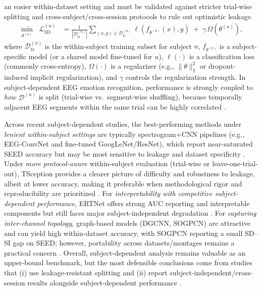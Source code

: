 \documentclass{WileyMSP-template}
\begin{document}
an easier within-dataset setting and must be validated against stricter trial-wise splitting and cross-subject/cross-session protocols to rule out optimistic leakage.
\begin{align}
\min_{\theta^{(u)}}\;\; \mathcal{L}_{\mathrm{SD}}^{(u)}
&=\frac{1}{|\mathcal{D}^{(u)}_{\mathrm{tr}}|}\sum_{(x,y)\in \mathcal{D}^{(u)}_{\mathrm{tr}}}\ell\!\left(f_{\theta^{(u)}}(x),y\right)
\;+\;\gamma\,\Omega\!\left(\theta^{(u)}\right),
\label{eq:subject_dependent_objective}
\end{align}
where $\mathcal{D}^{(u)}_{\mathrm{tr}}$ is the within-subject training subset for subject $u$, $f_{\theta^{(u)}}$ is a subject-specific model (or a shared model fine-tuned for $u$), $\ell(\cdot)$ is a classification loss (commonly cross-entropy), $\Omega(\cdot)$ is a regularizer (e.g., $\|\theta\|_2^2$ or dropout-induced implicit regularization), and $\gamma$ controls the regularization strength. In subject-dependent EEG emotion recognition, performance is strongly coupled to \emph{how} $\mathcal{D}^{(u)}$ is split (trial-wise vs.\ segment-wise shuffling), because temporally adjacent EEG segments within the same trial can be highly correlated \cite{ding2022tsception}.

Across recent subject-dependent studies, the best-performing methods under \emph{lenient within-subject settings} are typically spectrogram+CNN pipelines (e.g., EEG-ConvNet and fine-tuned GoogLeNet/ResNet), which report near-saturated SEED accuracy but may be most sensitive to leakage and dataset specificity \cite{khan2024eegconvnet}. Under \emph{more protocol-aware} within-subject evaluation (trial-wise or leave-one-trial-out), TSception provides a clearer picture of difficulty and robustness to leakage, albeit at lower accuracy, making it preferable when methodological rigor and reproducibility are prioritized \cite{ding2022tsception}. For \emph{interpretability with competitive subject-dependent performance}, ERTNet offers strong AUC reporting and interpretable components but still faces major subject-independent degradation \cite{liu2024ertnet}. For \emph{capturing inter-channel topology}, graph-based models (DGCNN, SOGPCN) are attractive and can yield high within-dataset accuracy, with SOGPCN reporting a small SD--SI gap on SEED; however, portability across datasets/montages remains a practical concern \cite{song2020dgcnn,zhu2024sogpcn}. Overall, subject-dependent analysis remains valuable as an upper-bound benchmark, but the most defensible conclusions come from studies that (i) use leakage-resistant splitting and (ii) report subject-independent/cross-session results alongside subject-dependent performance \cite{apicella2024neucom_systematic,wang2024csur_researchprogress}.
\end{document}
